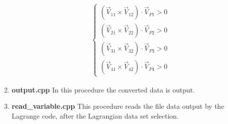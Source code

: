 \begin{enumerate}
\begin{eqnarray}
		\begin{cases}
			\left({\vec V}_{11}\times{\vec V}_{12}\right)\cdot{\vec V}_{P1}>0\\
			\left({\vec V}_{21}\times{\vec V}_{22}\right)\cdot{\vec V}_{P2}>0\\
			\left({\vec V}_{31}\times{\vec V}_{32}\right)\cdot{\vec V}_{P3}>0\\
			\left({\vec V}_{41}\times{\vec V}_{42}\right)\cdot{\vec V}_{P4}>0
		\end{cases}
\end{eqnarray}

\item{\bf output.cpp}
In this procedure the converted data is output. 
\item{\bf read\_variable.cpp}
This procedure reads the file data output by the Lagrange code, after the Lagrangian data set selection. 
\end{enumerate}

%